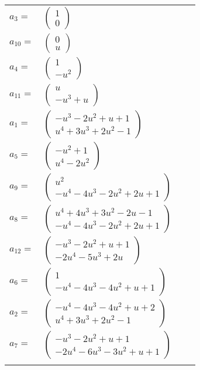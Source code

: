 \documentclass[1p]{elsarticle_modified}
\theoremstyle{definition}
\begin{document}
\begin{tabular}{m{7pt} m{180pt} m{7pt} m{180pt} }
\flushright $a_{3}=$&$\begin{pmatrix}1\\0\end{pmatrix}$ \\
\flushright $a_{10}=$&$\begin{pmatrix}0\\u\end{pmatrix}$ \\
\flushright $a_{4}=$&$\begin{pmatrix}1\\- u^2\end{pmatrix}$ \\
\flushright $a_{11}=$&$\begin{pmatrix}u\\- u^3+u\end{pmatrix}$ \\
\flushright $a_{1}=$&$\begin{pmatrix}- u^3-2 u^2+u+1\\u^4+3 u^3+2 u^2-1\end{pmatrix}$ \\
\flushright $a_{5}=$&$\begin{pmatrix}- u^2+1\\u^4-2 u^2\end{pmatrix}$ \\
\flushright $a_{9}=$&$\begin{pmatrix}u^2\\- u^4-4 u^3-2 u^2+2 u+1\end{pmatrix}$ \\
\flushright $a_{8}=$&$\begin{pmatrix}u^4+4 u^3+3 u^2-2 u-1\\- u^4-4 u^3-2 u^2+2 u+1\end{pmatrix}$ \\
\flushright $a_{12}=$&$\begin{pmatrix}- u^3-2 u^2+u+1\\-2 u^4-5 u^3+2 u\end{pmatrix}$ \\
\flushright $a_{6}=$&$\begin{pmatrix}1\\- u^4-4 u^3-4 u^2+u+1\end{pmatrix}$ \\
\flushright $a_{2}=$&$\begin{pmatrix}- u^4-4 u^3-4 u^2+u+2\\u^4+3 u^3+2 u^2-1\end{pmatrix}$ \\
\flushright $a_{7}=$&$\begin{pmatrix}- u^3-2 u^2+u+1\\-2 u^4-6 u^3-3 u^2+u+1\end{pmatrix}$\\&\end{tabular}
\end{document}
